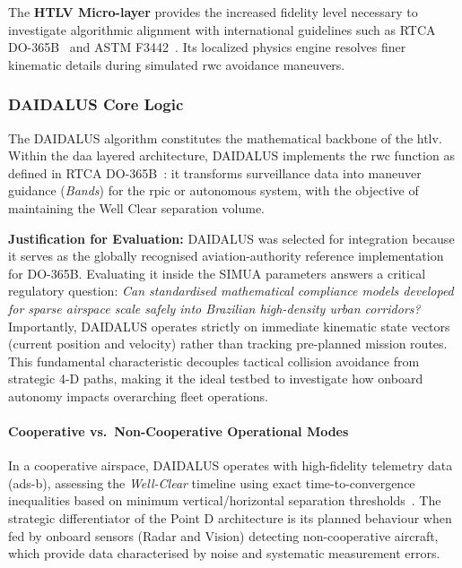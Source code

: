 The \textbf{HTLV Micro-layer} provides the increased fidelity level necessary to investigate
algorithmic alignment with international guidelines such as RTCA DO-365B~\cite{rtca_do365b}
and ASTM F3442~\cite{astm_f3442}. Its localized physics engine resolves finer kinematic details
during simulated \gls{rwc} avoidance maneuvers.

\subsubsection{DAIDALUS Core Logic}
\label{sec:daidalus}

The DAIDALUS algorithm constitutes the mathematical backbone of the \gls{htlv}. Within the
\gls{daa} layered architecture, DAIDALUS implements the \gls{rwc} function as defined in
RTCA DO-365B~\cite{rtca_do365b}: it transforms surveillance data into maneuver guidance
(\emph{Bands}) for the \gls{rpic} or autonomous system, with the objective of maintaining the
Well Clear separation volume.

\textbf{Justification for Evaluation:} DAIDALUS was selected for integration because it
serves as the globally recognised aviation-authority reference implementation for DO-365B.
Evaluating it inside the SIMUA parameters answers a critical regulatory question:
\emph{Can standardised mathematical compliance models developed for sparse airspace scale safely
into Brazilian high-density urban corridors?} Importantly, DAIDALUS operates strictly on
immediate kinematic state vectors (current position and velocity) rather than tracking
pre-planned mission routes. This fundamental characteristic decouples tactical collision
avoidance from strategic 4-D paths, making it the ideal testbed to investigate how onboard
autonomy impacts overarching fleet operations.

\paragraph{Cooperative vs.\ Non-Cooperative Operational Modes}
In a cooperative airspace, DAIDALUS operates with high-fidelity telemetry data (\gls{ads-b}),
assessing the \emph{Well-Clear} timeline using exact time-to-convergence inequalities based
on minimum vertical/horizontal separation thresholds~\cite{wellclear_nasa}. The strategic
differentiator of the Point D architecture is its planned behaviour when fed by onboard sensors
(Radar and Vision) detecting non-cooperative aircraft, which provide data characterised by
noise and systematic measurement errors.

